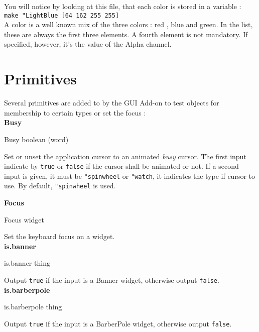 You will notice by looking at this file, that each color is stored in a variable :\\

{\tt make "LightBlue [64 162 255 255]}\\

A color is a well known mix of the three colors : red , blue and green. In the list, these are always the first three elements. A fourth element is not mandatory.  If specified, however, it's the
value of the Alpha channel. 

\section{Primitives}

Several primitives are added to \squirrel by the GUI Add-on to test objects for membership to certain types or set the focus :\\

\cbstart
{\bf Busy} 
\begin{verbatimtab}
Busy boolean (word)
\end{verbatimtab}
Set or unset the application cursor to an animated {\it busy} cursor. The first input indicate by {\tt true} or {\tt false} if the cursor shall be animated or not. If a second input is given, it must be {\tt "spinwheel} or {\tt "watch}, it indicates the type if cursor to use. By default, {\tt "spinwheel} is used.\\
\cbend

{\bf Focus} 
\begin{verbatimtab}
Focus widget
\end{verbatimtab}
Set the keyboard focus on a widget.\\

{\bf is.banner} 
\begin{verbatimtab}
is.banner thing
\end{verbatimtab}
Output {\tt true} if the input is a Banner widget, otherwise output {\tt false}.\\

{\bf is.barberpole} 
\begin{verbatimtab}
is.barberpole thing
\end{verbatimtab}
Output {\tt true} if the input is a BarberPole widget, otherwise output {\tt false}.\\

